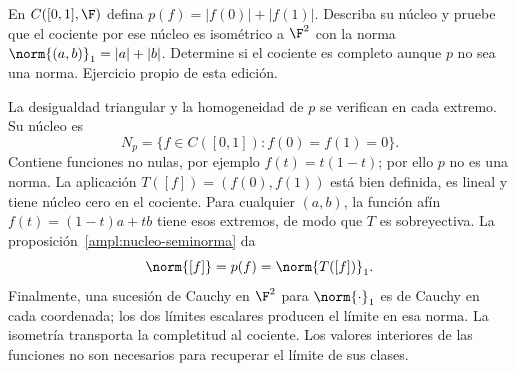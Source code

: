 \begin{ejercicio}\label{ej:ampl-cocientes-4}
En $C([0,1],\F)$ defina $p(f)=|f(0)|+|f(1)|$. Describa su núcleo y pruebe que el cociente por ese núcleo es isométrico a $\F^2$ con la norma $\norm{(a,b)}_1=|a|+|b|$. Determine si el cociente es completo aunque $p$ no sea una norma. Ejercicio propio de esta edición.
\end{ejercicio}
\begin{solucion}
La desigualdad triangular y la homogeneidad de $p$ se verifican en cada extremo. Su núcleo es
\[
 N_p=\{f\in C([0,1]):f(0)=f(1)=0\}.
\]
Contiene funciones no nulas, por ejemplo $f(t)=t(1-t)$; por ello $p$ no es una norma. La aplicación $T([f])=(f(0),f(1))$ está bien definida, es lineal y tiene núcleo cero en el cociente. Para cualquier $(a,b)$, la función afín $f(t)=(1-t)a+tb$ tiene esos extremos, de modo que $T$ es sobreyectiva. La proposición~\ref{ampl:nucleo-seminorma} da
\[
 \norm{[f]}=p(f)=\norm{T([f])}_1.
\]
Finalmente, una sucesión de Cauchy en $\F^2$ para $\norm{\cdot}_1$ es de Cauchy en cada coordenada; los dos límites escalares producen el límite en esa norma. La isometría transporta la completitud al cociente. Los valores interiores de las funciones no son necesarios para recuperar el límite de sus clases.
\end{solucion}

